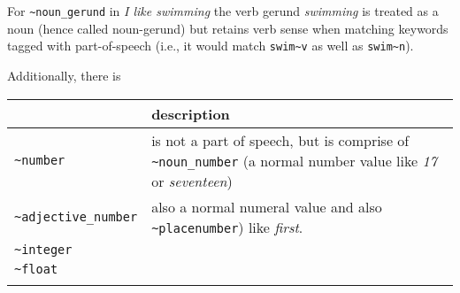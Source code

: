 \documentclass[]{article}
\begin{document}
For \texttt{\textasciitilde{}noun\_gerund} in \emph{I like swimming} the
verb gerund \emph{swimming} is treated as a noun (hence called
noun-gerund) but retains verb sense when matching keywords tagged with
part-of-speech (i.e., it would match \texttt{swim\textasciitilde{}v} as
well as \texttt{swim\textasciitilde{}n}).

Additionally, there is

\begin{longtable}[]{@{}ll@{}}
\toprule
\begin{minipage}[b]{0.30\columnwidth}\raggedright\strut
\strut
\end{minipage} & \begin{minipage}[b]{0.20\columnwidth}\raggedright\strut
description\strut
\end{minipage}\tabularnewline
\midrule
\endhead
\begin{minipage}[t]{0.30\columnwidth}\raggedright\strut
\texttt{\textasciitilde{}number}\strut
\end{minipage} & \begin{minipage}[t]{0.20\columnwidth}\raggedright\strut
is not a part of speech, but is comprise of
\texttt{\textasciitilde{}noun\_number} (a normal number value like
\emph{17} or \emph{seventeen})\strut
\end{minipage}\tabularnewline
\begin{minipage}[t]{0.30\columnwidth}\raggedright\strut
\texttt{\textasciitilde{}adjective\_number}\strut
\end{minipage} & \begin{minipage}[t]{0.20\columnwidth}\raggedright\strut
also a normal numeral value and also
\texttt{\textasciitilde{}placenumber}) like \emph{first}.\strut
\end{minipage}\tabularnewline
\begin{minipage}[t]{0.30\columnwidth}\raggedright\strut
\texttt{\textasciitilde{}integer}\strut
\end{minipage} & \begin{minipage}[t]{0.20\columnwidth}\raggedright\strut
\strut
\end{minipage}\tabularnewline
\begin{minipage}[t]{0.30\columnwidth}\raggedright\strut
\texttt{\textasciitilde{}float}\strut
\end{minipage} & \begin{minipage}[t]{0.20\columnwidth}\raggedright\strut
\strut
\end{minipage}\tabularnewline
\begin{minipage}[t]{0.30\columnwidth}\raggedright\strut

\end{minipage}
\end{longtable}
\end{document}

